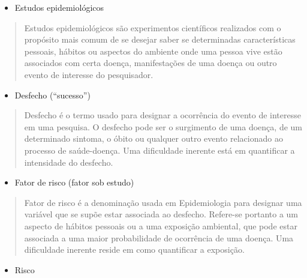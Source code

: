 \documentclass[
]{book}
\providecommand{\tightlist}{%
  \setlength{\itemsep}{0pt}\setlength{\parskip}{0pt}}
\begin{document}
\hfill\break

\begin{itemize}
\tightlist
\item
  Estudos epidemiológicos
\end{itemize}

\hfill\break

\begin{quote}
Estudos epidemiológicos são experimentos científicos realizados com o propósito mais comum de se desejar saber se determinadas características pessoais, hábitos ou aspectos do ambiente onde uma pessoa vive estão associados com certa doença, manifestações de uma doença ou outro evento de interesse do pesquisador.
\end{quote}

\hfill\break

\begin{itemize}
\tightlist
\item
  Desfecho (``sucesso'')
\end{itemize}

\hfill\break

\begin{quote}
Desfecho é o termo usado para designar a ocorrência do evento de interesse em uma pesquisa. O desfecho pode ser o surgimento de uma doença, de um determinado sintoma, o óbito ou qualquer outro evento relacionado ao processo de saúde-doença. Uma dificuldade inerente está em quantificar a intensidade do desfecho.
\end{quote}

\hfill\break

\begin{itemize}
\tightlist
\item
  Fator de risco (fator sob estudo)
\end{itemize}

\hfill\break

\begin{quote}
Fator de risco é a denominação usada em Epidemiologia para designar uma variável que se supõe estar associada ao desfecho. Refere-se portanto a um aspecto de hábitos pessoais ou a uma exposição ambiental, que pode estar associada a uma maior probabilidade de ocorrência de uma doença. Uma dificuldade inerente reside em como quantificar a exposição.
\end{quote}

\hfill\break

\begin{itemize}
\tightlist
\item
  Risco
\end{itemize}
\end{document}
